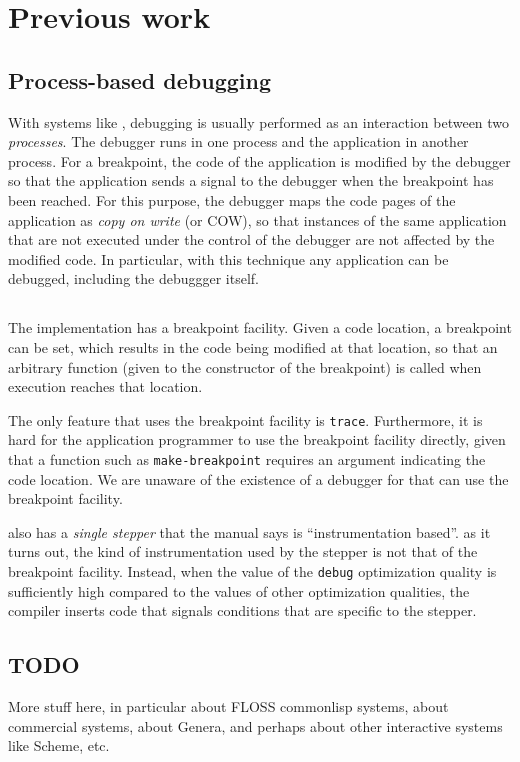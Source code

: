 \section{Previous work}

\subsection{Process-based debugging}

With systems like \unix{}, debugging is usually performed as an
interaction between two \emph{processes}.  The debugger runs in one
process and the application in another process.  For a breakpoint, the
code of the application is modified by the debugger so that the
application sends a signal to the debugger when the breakpoint has
been reached.  For this purpose, the debugger maps the code pages of
the application as \emph{copy on write} (or COW), so that instances of
the same application that are not executed under the control of the
debugger are not affected by the modified code.  In particular, with
this technique any application can be debugged, including the
debuggger itself.

\subsection{\sbcl{}}

The \sbcl{} \commonlisp{} implementation has a breakpoint facility.
Given a code location, a breakpoint can be set, which results in the
code being modified at that location, so that an arbitrary function
(given to the constructor of the breakpoint) is called when execution
reaches that location.

The only feature that uses the breakpoint facility is \texttt{trace}.
Furthermore, it is hard for the application programmer to use the
breakpoint facility directly, given that a function such as
\texttt{make-breakpoint} requires an argument indicating the code
location.  We are unaware of the existence of a debugger for \sbcl{}
that can use the breakpoint facility.

\sbcl{} also has a \emph{single stepper} that the manual says is
``instrumentation based''.  as it turns out, the kind of
instrumentation used by the stepper is not that of the breakpoint
facility.  Instead, when the value of the \texttt{debug} optimization
quality is sufficiently high compared to the values of other
optimization qualities, the compiler inserts code that signals
conditions that are specific to the stepper.

\subsection{TODO}

More stuff here, in particular about FLOSS commonlisp{} systems, about
commercial \commonlisp{} systems, about Genera, and perhaps about
other interactive systems like Scheme, etc.
